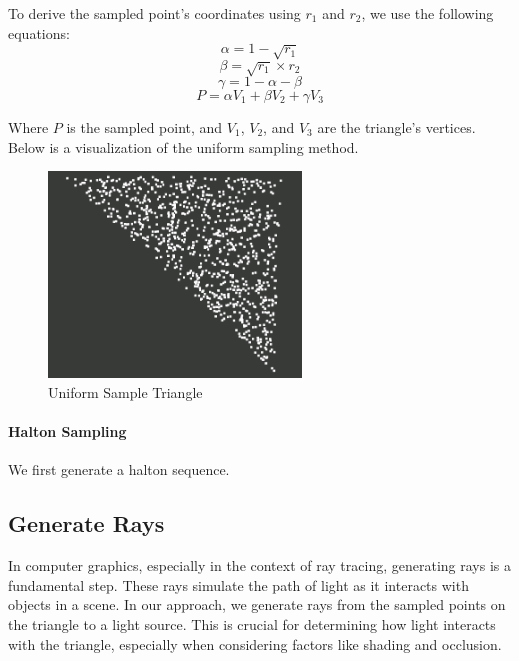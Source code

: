 \documentclass[11pt, a4paper,oneside,chapterprefix=false]{scrbook}
\begin{document}
\vspace{10pt}

To derive the sampled point's coordinates using \( r_1 \) and \( r_2 \), we use the following equations:
\[ \alpha = 1 - \sqrt{r_1} \]
\[ \beta = \sqrt{r_1} \times r_2 \]
\[ \gamma = 1 - \alpha - \beta \]
\[ P = \alpha V_1 + \beta V_2 + \gamma V_3 \]

Where \( P \) is the sampled point, and \( V_1 \), \( V_2 \), and \( V_3 \) are the triangle's vertices. Below is a visualization of the uniform sampling method.

\begin{minipage}{\textwidth}
	\begin{figure}[H]
		\centering
		\includegraphics*[width=0.6\textwidth]{figures/uniform sample triangle.png}
		\caption{Uniform Sample Triangle}
		\label{fig:uniform sample triangle}
	\end{figure}
\end{minipage}

\paragraph{Halton Sampling}

We first generate a halton sequence.



\subsection{Generate Rays}

In computer graphics, especially in the context of ray tracing, generating rays is a fundamental step. These rays simulate the path of light as it interacts with objects in a scene. In our approach, we generate rays from the sampled points on the triangle to a light source. This is crucial for determining how light interacts with the triangle, especially when considering factors like shading and occlusion.
\end{document}
